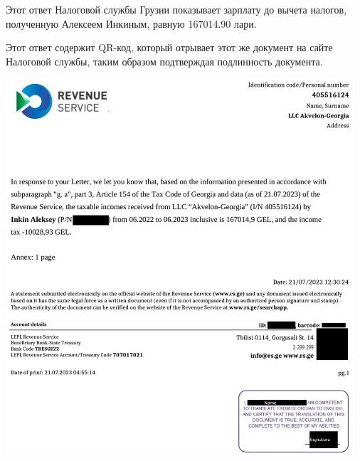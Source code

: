 
Этот ответ Налоговой службы Грузии показывает зарплату до вычета налогов,
полученную Алексеем Инкиным, равную 167014.90 лари.

Этот ответ содержит QR-код, который отрывает этот же документ на сайте
Налоговой службы, таким образом подтверждая подлинность документа.

\begin{center}
    \includegraphics[width=35em]{rs-1_en_public}
\end{center}




